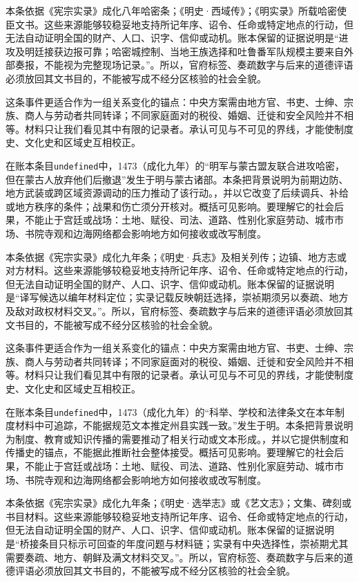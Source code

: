 本条依据《宪宗实录》成化八年哈密条；《明史·西域传》；《明实录》所载哈密使臣文书。这些来源能够较稳妥地支持所记年序、诏令、任命或特定地点的行动，但无法自动证明全国的财产、人口、识字、信仰或动机。账本保留的证据说明是“进攻及明廷接获边报可靠；哈密城控制、当地王族选择和吐鲁番军队规模主要来自外部奏报，不能视为完整现场记录。”。所以，官府标签、奏疏数字与后来的道德评语必须放回其文书目的，不能被写成不经分区核验的社会全貌。

这条事件更适合作为一组关系变化的锚点：中央方案需由地方官、书吏、士绅、宗族、商人与劳动者共同转译；不同家庭面对的税役、婚姻、迁徙和安全风险并不相等。材料只让我们看见其中有限的记录者。承认可见与不可见的界线，才能使制度史、文化史和区域史互相校正。

在账本条目\texttt{undefined}中，1473（成化九年）的“明军与蒙古盟友联合进攻哈密，但在蒙古人放弃他们后撤退”发生于明与蒙古诸部。本条把背景说明为前期边防、地方武装或跨区域资源调动的压力推动了该行动。，并以它改变了后续调兵、补给或地方秩序的条件；战果和伤亡须分开核对。概括可见影响。要理解它的社会后果，不能止于宫廷或战场：土地、赋役、司法、道路、性别化家庭劳动、城市市场、书院寺观和边海网络都会影响地方如何接收或改写制度。

本条依据《宪宗实录》成化九年条；《明史·兵志》及相关列传；边镇、地方志或对方材料。这些来源能够较稳妥地支持所记年序、诏令、任命或特定地点的行动，但无法自动证明全国的财产、人口、识字、信仰或动机。账本保留的证据说明是“译写候选以编年材料定位；实录记载反映朝廷选择，崇祯期须另以奏疏、地方及敌对政权材料交叉。”。所以，官府标签、奏疏数字与后来的道德评语必须放回其文书目的，不能被写成不经分区核验的社会全貌。

这条事件更适合作为一组关系变化的锚点：中央方案需由地方官、书吏、士绅、宗族、商人与劳动者共同转译；不同家庭面对的税役、婚姻、迁徙和安全风险并不相等。材料只让我们看见其中有限的记录者。承认可见与不可见的界线，才能使制度史、文化史和区域史互相校正。

在账本条目\texttt{undefined}中，1473（成化九年）的“科举、学校和法律条文在本年制度材料中可追踪，不能据规范文本推定州县实践一致。”发生于明。本条把背景说明为制度、教育或知识传播的需要推动了相关行动或文本形成。，并以它提供制度和传播史的锚点，不能据此推断社会整体接受。概括可见影响。要理解它的社会后果，不能止于宫廷或战场：土地、赋役、司法、道路、性别化家庭劳动、城市市场、书院寺观和边海网络都会影响地方如何接收或改写制度。

本条依据《宪宗实录》成化九年条；《明史·选举志》或《艺文志》；文集、碑刻或书目材料。这些来源能够较稳妥地支持所记年序、诏令、任命或特定地点的行动，但无法自动证明全国的财产、人口、识字、信仰或动机。账本保留的证据说明是“桥接条目只标示可回查的年度问题与材料链；实录有中央选择性，崇祯期尤其需要奏疏、地方、朝鲜及满文材料交叉。”。所以，官府标签、奏疏数字与后来的道德评语必须放回其文书目的，不能被写成不经分区核验的社会全貌。

